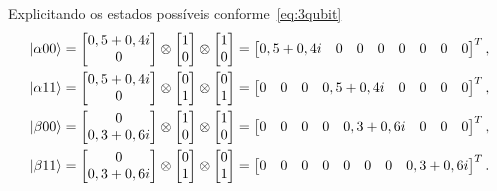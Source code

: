Explicitando os estados possíveis conforme~\eqref{eq:3qubit}
\begin{equation}
  \begin{split}
    \ket{\alpha 00} &= \begin{bmatrix} {0,5+0,4i} \\ 0 \end{bmatrix} \otimes
                     \begin{bmatrix} 1 \\ 0 \end{bmatrix} \otimes
                     \begin{bmatrix} 1 \\ 0 \end{bmatrix} =
                     \begin{bmatrix} {0,5+0,4i} & 0 & 0 & 0 & 0 & 0 & 0 & 0 \end{bmatrix}^T, \\
    \ket{\alpha 11} &= \begin{bmatrix} {0,5+0,4i} \\ 0 \end{bmatrix} \otimes
                        \begin{bmatrix} 0 \\ 1 \end{bmatrix} \otimes
                        \begin{bmatrix} 0 \\ 1 \end{bmatrix} =
                        \begin{bmatrix} 0 & 0 & 0 & {0,5+0,4i} & 0 & 0 & 0 & 0 \end{bmatrix}^T, \\
    \ket{\beta 00} &= \begin{bmatrix} 0 \\ {0,3+0,6i} \end{bmatrix} \otimes
                    \begin{bmatrix} 1 \\ 0 \end{bmatrix} \otimes
                    \begin{bmatrix} 1 \\ 0 \end{bmatrix} =
                    \begin{bmatrix} 0 & 0 & 0 & 0 & {0,3+0,6i} & 0 & 0 & 0 \end{bmatrix}^T, \\
    \ket{\beta 11} &= \begin{bmatrix} 0 \\ {0,3+0,6i} \end{bmatrix} \otimes
                       \begin{bmatrix} 0 \\ 1 \end{bmatrix} \otimes
                       \begin{bmatrix} 0 \\ 1 \end{bmatrix} =
                       \begin{bmatrix} 0 & 0 & 0 & 0 & 0 & 0 & 0 & {0,3+0,6i} \end{bmatrix}^T.
  \end{split}
\end{equation}
